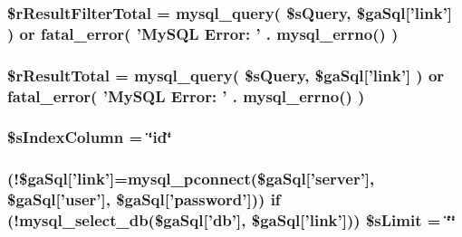 \hypertarget{custom__data__property_8php_a29b3b8a9782e4c5b8157be2ba70a33e1}{
\subsubsection[{\$r\+Result\+Filter\+Total}]{\setlength{\rightskip}{0pt plus 5cm}\$r\+Result\+Filter\+Total = mysql\+\_\+query( \$s\+Query, \$ga\+Sql\mbox{[}'link'\mbox{]} ) or {\bf fatal\+\_\+error}( 'My\+S\+Q\+L Error\+: ' . mysql\+\_\+errno() )}}\label{custom__data__property_8php_a29b3b8a9782e4c5b8157be2ba70a33e1}
\hypertarget{custom__data__property_8php_a48722b6bbefe9d4cb748bf0c3f936272}{
\subsubsection[{\$r\+Result\+Total}]{\setlength{\rightskip}{0pt plus 5cm}\$r\+Result\+Total = mysql\+\_\+query( \$s\+Query, \$ga\+Sql\mbox{[}'link'\mbox{]} ) or {\bf fatal\+\_\+error}( 'My\+S\+Q\+L Error\+: ' . mysql\+\_\+errno() )}}\label{custom__data__property_8php_a48722b6bbefe9d4cb748bf0c3f936272}
\hypertarget{custom__data__property_8php_a8bddf0b8ded9777b9068de5fa9e217a2}{
\subsubsection[{\$s\+Index\+Column}]{\setlength{\rightskip}{0pt plus 5cm}\$s\+Index\+Column = \char`\"{}id\char`\"{}}}\label{custom__data__property_8php_a8bddf0b8ded9777b9068de5fa9e217a2}
\hypertarget{custom__data__property_8php_a867f070c3b4e597275c622aac60de587}{
\subsubsection[{\$s\+Limit}]{ (!\$ga\+Sql\mbox{[}'link'\mbox{]}=mysql\+\_\+pconnect(\$ga\+Sql\mbox{[}'server'\mbox{]}, \$ga\+Sql\mbox{[}'user'\mbox{]}, \$ga\+Sql\mbox{[}'password'\mbox{]})) {\bf if} (!mysql\+\_\+select\+\_\+db(\$ga\+Sql\mbox{[}'db'\mbox{]}, \$ga\+Sql\mbox{[}'link'\mbox{]})) \$s\+Limit = \char`\"{}\char`\"{}}}\label{custom__data__property_8php_a867f070c3b4e597275c622aac60de587}
